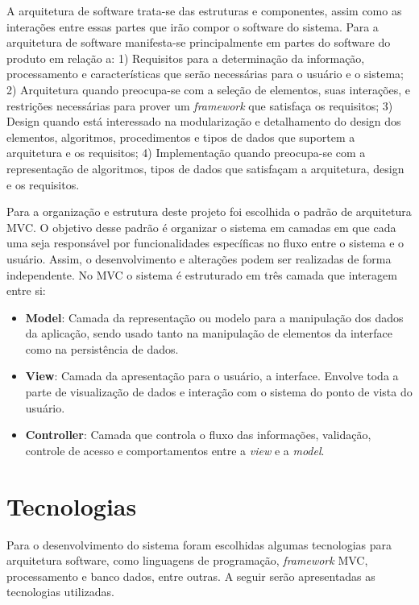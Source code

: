 A arquitetura de software trata-se das estruturas e componentes, assim como as interações entre essas partes que irão compor o software do sistema. Para \cite{Perry1992} a arquitetura de software manifesta-se principalmente em partes do software do produto em relação a: 1) Requisitos para a determinação da informação, processamento e características que serão necessárias para o usuário e o sistema; 2) Arquitetura quando preocupa-se com a seleção de elementos, suas interações, e restrições necessárias para prover um \textit{framework} que satisfaça os requisitos; 3) Design quando está interessado na modularização e detalhamento do design dos elementos, algoritmos, procedimentos e tipos de dados que suportem a arquitetura e os requisitos; 4) Implementação quando preocupa-se com a representação de algoritmos, tipos de dados que satisfaçam a arquitetura, design e os requisitos.

Para a organização e estrutura deste projeto foi escolhida o padrão de arquitetura \ac{MVC}. O objetivo desse padrão é organizar o sistema em camadas em que cada uma seja responsável por funcionalidades específicas no fluxo entre o sistema e o usuário. Assim, o desenvolvimento e alterações podem ser realizadas de forma independente. No \ac{MVC} o sistema é estruturado em três camada que interagem entre si:

\begin{itemize}
	\item{\textbf{Model}: Camada da representação ou modelo para a manipulação dos dados da aplicação, sendo usado tanto na manipulação de elementos da interface como na persistência de dados.}
	
	\item{\textbf{View}: Camada da apresentação para o usuário, a interface. Envolve toda a parte de visualização de dados e interação com o sistema do ponto de vista do usuário.}
	
	\item{\textbf{Controller}: Camada que controla o fluxo das informações, validação, controle de acesso e comportamentos entre a \textit{view} e a \textit{model}.}
\end{itemize}

\section{Tecnologias}

Para o desenvolvimento do sistema foram escolhidas algumas tecnologias para arquitetura software, como linguagens de programação, \textit{framework} \ac{MVC}, processamento e banco dados, entre outras. A seguir serão apresentadas as tecnologias utilizadas.

